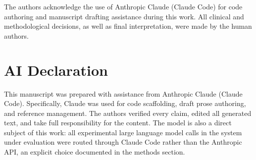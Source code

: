 \documentclass[preprint,authoryear,1p,12pt]{elsarticle}
\begin{document}
The authors acknowledge the use of Anthropic Claude (Claude Code) for code
authoring and manuscript drafting assistance during this work. All clinical
and methodological decisions, as well as final interpretation, were made by
the human authors.

\section*{AI Declaration}

This manuscript was prepared with assistance from Anthropic Claude (Claude
Code). Specifically, Claude was used for code scaffolding, draft prose
authoring, and reference management. The authors verified every claim,
edited all generated text, and take full responsibility for the content.
The model is also a direct subject of this work: all experimental large
language model calls in the system under evaluation were routed through
Claude Code rather than the Anthropic API, an explicit choice documented in
the methods section.



\end{document}
